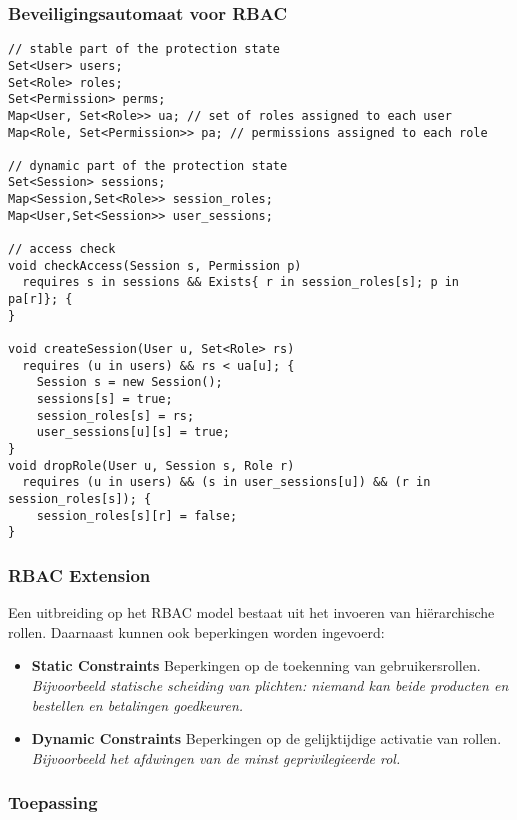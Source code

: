 \documentclass[../main.tex]{subfiles}
\begin{document}
\subsubsection{Beveiligingsautomaat voor RBAC}
\begin{lstlisting}
// stable part of the protection state
Set<User> users;
Set<Role> roles;
Set<Permission> perms;
Map<User, Set<Role>> ua; // set of roles assigned to each user
Map<Role, Set<Permission>> pa; // permissions assigned to each role

// dynamic part of the protection state
Set<Session> sessions;
Map<Session,Set<Role>> session_roles;
Map<User,Set<Session>> user_sessions;

// access check
void checkAccess(Session s, Permission p)
  requires s in sessions && Exists{ r in session_roles[s]; p in pa[r]}; {
}

void createSession(User u, Set<Role> rs)
  requires (u in users) && rs < ua[u]; {
    Session s = new Session();
    sessions[s] = true;
    session_roles[s] = rs;
    user_sessions[u][s] = true;
}
void dropRole(User u, Session s, Role r)
  requires (u in users) && (s in user_sessions[u]) && (r in session_roles[s]); {
    session_roles[s][r] = false;
}
\end{lstlisting}

\subsubsection{RBAC Extension}
Een uitbreiding op het RBAC model bestaat uit het invoeren van hi\"erarchische rollen. Daarnaast kunnen ook beperkingen worden ingevoerd:
\begin{itemize}
	\item \textbf{Static Constraints} Beperkingen op de toekenning van gebruikersrollen.
	\\ \textit{Bijvoorbeeld statische scheiding van plichten: niemand kan beide producten en bestellen en betalingen goedkeuren.}
	\item \textbf{Dynamic Constraints} Beperkingen op de gelijktijdige activatie van rollen.
	\\ \textit{Bijvoorbeeld het afdwingen van de minst geprivilegieerde rol.}

\end{itemize}

\subsubsection{Toepassing}
\end{document}
